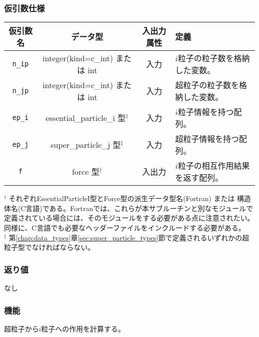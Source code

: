 \subsubsection*{仮引数仕様}
\begin{table}[H]
\begin{tabularx}{\linewidth}{cccX}
\toprule
\rowcolor{Snow2}
仮引数名 & データ型 & 入出力属性 & 定義 \\
\midrule
\texttt{n\_ip} & integer(kind=c\_int) または int & 入力 & $i$粒子の粒子数を格納した変数。\\
\texttt{n\_jp} & integer(kind=c\_int) または int & 入力 & 超粒子の粒子数を格納した変数。\\
\texttt{ep\_i} & essential\_particle\_i 型$^{\dagger}$ & 入力 & $i$粒子情報を持つ配列。\\
\texttt{ep\_j} & super\_particle\_j 型$^{\ddagger}$ & 入力 & 超粒子情報を持つ配列。\\
\texttt{f} & force 型$^{\dagger}$ & 入出力 & $i$粒子の相互作用結果を返す配列。\\
\bottomrule
\end{tabularx}
\begin{flushleft}
$^{\dagger}$ それぞれEssentialParticleI型とForce型の派生データ型名(Fortran) または 構造体名(C言語)である。Fortranでは、これらが本サブルーチンと別なモジュールで定義されている場合には、そのモジュールをする必要がある点に注意されたい。同様に、C言語でも必要なヘッダーファイルをインクルードする必要がある。\\
$^{\ddagger}$ 第\ref{chap:data_types}章\ref{sec:super_particle_types}節で定義されるいずれかの超粒子型でなければならない。
\end{flushleft}
\end{table}


\subsubsection*{返り値}
なし

\subsubsection*{機能}
超粒子から$i$粒子への作用を計算する。
